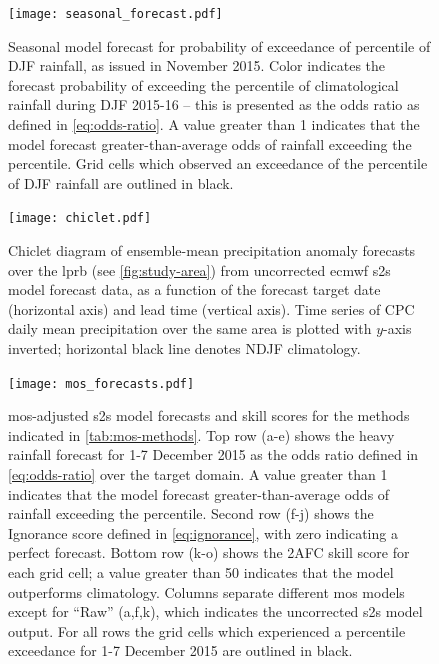 \documentclass[twocol]{ametsoc}
\begin{document}
\begin{figure}
	\noindent\texttt{[image: seasonal\_forecast.pdf]}
	\caption{
		Seasonal model forecast for probability of exceedance of  percentile of DJF rainfall, as issued in November 2015.
		Color indicates the forecast probability of exceeding the  percentile of climatological rainfall during DJF 2015-16 -- this is presented as the odds ratio as defined in \cref{eq:odds-ratio}.
		A value greater than 1 indicates that the model forecast greater-than-average odds of rainfall exceeding the  percentile.
		Grid cells which observed an exceedance of the  percentile of DJF rainfall are outlined in black.
	}\label{fig:seas-prob-fcst}
\end{figure}

\begin{figure}
	\noindent\texttt{[image: chiclet.pdf]}
	\caption{
		Chiclet diagram \citep[see][]{Carbin2016} of ensemble-mean precipitation anomaly forecasts over the \acrlong{lprb} (see \cref{fig:study-area}) from uncorrected \gls{ecmwf} \gls{s2s} model forecast data, as a function of the forecast target date (horizontal axis) and lead time (vertical axis).
		Time series of CPC daily mean precipitation over the same area is plotted with $y$-axis inverted; horizontal black line denotes NDJF climatology.
	}\label{fig:chiclet}
\end{figure}

\begin{figure}
	\noindent\texttt{[image: mos\_forecasts.pdf]}
	\caption{
		\Gls{mos}-adjusted \gls{s2s} model forecasts and skill scores for the methods indicated in \cref{tab:mos-methods}.
		Top row (a-e) shows the heavy rainfall forecast for 1-7 December 2015 as the odds ratio defined in \cref{eq:odds-ratio} over the target domain.
		A value greater than 1 indicates that the model forecast greater-than-average odds of rainfall exceeding the  percentile.
        Second row (f-j) shows the Ignorance score defined in \cref{eq:ignorance}, with zero indicating a perfect forecast.
		Bottom row (k-o) shows the 2AFC skill score for each grid cell; a value greater than 50 indicates that the model outperforms climatology.
		Columns separate different \gls{mos} models except for ``Raw'' (a,f,k), which indicates the uncorrected \gls{s2s} model output.
		For all rows the grid cells which experienced a  percentile exceedance for 1-7 December 2015 are outlined in black.
	}\label{fig:subs-prob-fcst}
\end{figure}
\end{document}

